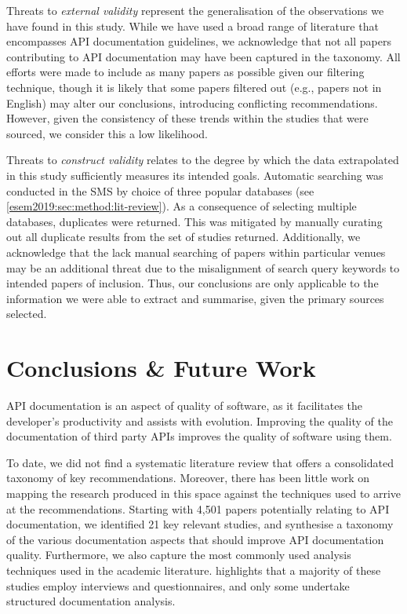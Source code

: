 
Threats to \textit{external validity} represent the generalisation of the observations we have found in this study. While we have used a broad range of literature that encompasses API documentation guidelines, we acknowledge that not all papers contributing to API documentation may have been captured in the taxonomy. All efforts were made to include as many papers as possible given our filtering technique, though it is likely that some papers filtered out (e.g., papers not in English) may alter our conclusions, introducing conflicting recommendations. However, given the consistency of these trends within the studies that were sourced, we consider this a low likelihood.

Threats to \textit{construct validity} relates to the degree by which the data extrapolated in this study sufficiently measures its intended goals. Automatic searching was conducted in the SMS by choice of three popular databases (see \cref{esem2019:sec:method:lit-review}). As a consequence of selecting multiple databases, duplicates were returned. This was mitigated by manually curating out all duplicate results from the set of studies returned. Additionally, we acknowledge that the lack manual searching of papers within particular venues may be an additional threat due to the misalignment of search query keywords to intended papers of inclusion. Thus, our conclusions are only applicable to the information we were able to extract and summarise, given the primary sources selected.

\section{Conclusions \& Future Work}
\label{esem2019:sec:conclusions}

API documentation is an aspect of quality of software, as it facilitates the developer's productivity and assists with evolution. Improving the quality of the documentation of third party APIs improves the quality of software using them.

To date, we did not find a systematic literature review that offers a consolidated taxonomy of key recommendations. Moreover, there has been little work on mapping the research produced in this space against the techniques used to arrive at the recommendations.
Starting with 4,501 papers potentially relating to API documentation, we identified 21 key relevant studies, and synthesise a taxonomy of the various documentation aspects that should improve API documentation quality. Furthermore, we also capture the most commonly used analysis techniques used in the academic literature.  highlights that a majority of these studies employ interviews and questionnaires, and only some undertake structured documentation analysis. 

